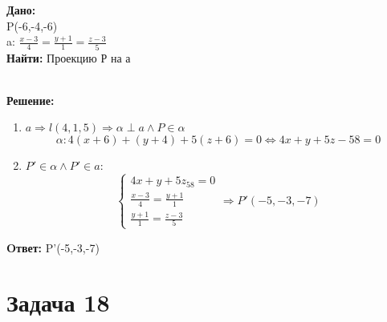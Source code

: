 \documentclass{article}
\begin{document}
\begin{minipage}[t]{0.45\textwidth}

\textbf{Дано:}\\ 
P(-6,-4,-6)\\
a: $ \frac{x-3}{4}= \frac{y+1}{1} = \frac{z-3}{5} $\\
\textbf{Найти: } Проекцию Р на а
\end{minipage}
\begin{minipage}[t]{0.45\textwidth}
  \vspace{-\baselineskip} %

\begin{center}
\end{center}
\end{minipage}
\\
\textbf{Решение:}
\begin{enumerate}
  \item $ a \Rightarrow l(4,1,5) \Rightarrow \alpha \perp a \land P \in \alpha$
    \[
      \alpha: 4(x+6) + (y+4) + 5(z+6) = 0 \Leftrightarrow 4x+y+5z-58 =0 
    \]
  \item $P' \in \alpha \land P' \in a $: 
    \[
      \begin{cases}
        4x+y+5z_58 =0\\ 
 \frac{x-3}{4}= \frac{y+1}{1}\\ 
 \frac{y+1}{1} = \frac{z-3}{5} 
      \end{cases}
      \Rightarrow P'(-5,-3,-7)
    \]
\end{enumerate}

\textbf{Oтвет: } P'(-5,-3,-7)

\section*{Задача 18}
\end{document}
